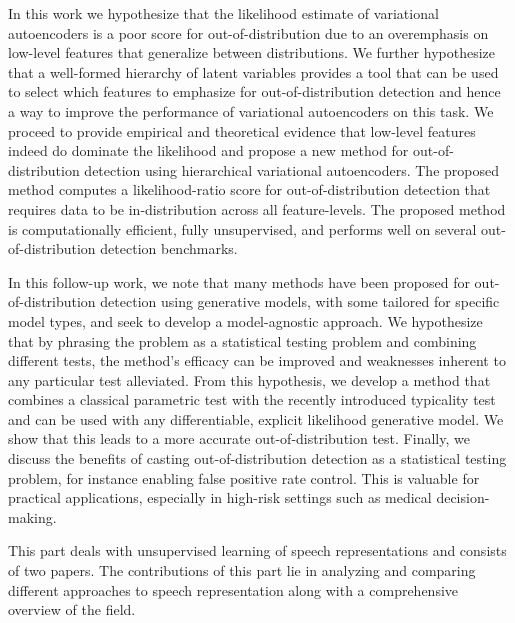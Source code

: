 In this work we hypothesize that the likelihood estimate of variational autoencoders is a poor score for out-of-distribution due to an overemphasis on low-level features that generalize between distributions. 
We further hypothesize that a well-formed hierarchy of latent variables provides a tool that can be used to select which features to emphasize for out-of-distribution detection and hence a way to improve the performance of variational autoencoders on this task. 
We proceed to provide empirical and theoretical evidence that low-level features indeed do dominate the likelihood and propose a new method for out-of-distribution detection using hierarchical variational autoencoders. 
The proposed method computes a likelihood-ratio score for out-of-distribution detection that requires data to be in-distribution across all feature-levels. 
The proposed method is computationally efficient, fully unsupervised, and performs well on several out-of-distribution detection benchmarks. 

In this follow-up work, we note that many methods have been proposed for out-of-distribution detection using generative models, with some tailored for specific model types, and seek to develop a model-agnostic approach. 
We hypothesize that by phrasing the problem as a statistical testing problem and combining different tests, the method's efficacy can be improved and weaknesses inherent to any particular test alleviated. 
From this hypothesis, we develop a method that combines a classical parametric test with the recently introduced typicality test and can be used with any differentiable, explicit likelihood generative model.
We show that this leads to a more accurate out-of-distribution test. 
Finally, we discuss the benefits of casting out-of-distribution detection as a statistical testing problem, for instance enabling false positive rate control. This is valuable for practical applications, especially in high-risk settings such as medical decision-making.


This part deals with unsupervised learning of speech representations and consists of two papers. 
The contributions of this part lie in analyzing and comparing different approaches to speech representation along with a comprehensive overview of the field.

